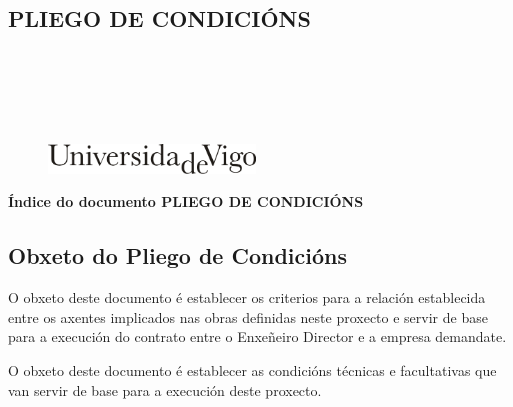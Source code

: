 \documentclass[11pt,twoside]{book}
\begin{document}
\begin{center}
\begin{normalsize}
\begin{center}
\part{\bf{PLIEGO DE CONDICIÓNS}}\thispagestyle{empty}
\end{center}
\end{normalsize}
\ \\
\ \\
\ \\
\ \\

\begin{center}
\begin{figure}[htbp]
\begin{center}
\includegraphics[angle=0, height=0.8cm]{images/UVIGOLogo.png}
\end{center}
\end{figure}
\end{center}

\end{center}

\cleardoublepage


\pagestyle{fancy}
\startcontents[parts]
\begin{center}{\large \bf Índice do documento PLIEGO DE CONDICIÓNS}\end{center}

{\hypersetup{hidelinks}}

\cleardoublepage

\chapter{Obxeto do Pliego de Condicións}

O obxeto deste documento é establecer os criterios para a relación establecida entre os axentes implicados nas obras definidas neste proxecto e servir de base para a execución do contrato entre o Enxeñeiro Director e a empresa demandate.

O obxeto deste documento é establecer as condicións técnicas e facultativas que van servir de base para a execución deste proxecto.
\end{document}
